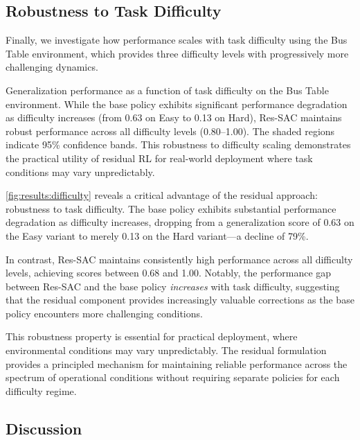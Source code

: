 \subsection{Robustness to Task Difficulty}
\label{sec:results:difficulty}

Finally, we investigate how performance scales with task difficulty using the Bus Table environment, which provides three difficulty levels with progressively more challenging dynamics.

{Generalization performance as a function of task difficulty on the Bus Table environment. While the base policy exhibits significant performance degradation as difficulty increases (from 0.63 on Easy to 0.13 on Hard), Res-SAC maintains robust performance across all difficulty levels (0.80--1.00). The shaded regions indicate 95\% confidence bands. This robustness to difficulty scaling demonstrates the practical utility of residual \ac{RL} for real-world deployment where task conditions may vary unpredictably.}

\autoref{fig:results:difficulty} reveals a critical advantage of the residual approach: robustness to task difficulty. The base policy exhibits substantial performance degradation as difficulty increases, dropping from a generalization score of 0.63 on the Easy variant to merely 0.13 on the Hard variant---a decline of 79\%.

In contrast, Res-SAC maintains consistently high performance across all difficulty levels, achieving scores between 0.68 and 1.00. Notably, the performance gap between Res-SAC and the base policy \emph{increases} with task difficulty, suggesting that the residual component provides increasingly valuable corrections as the base policy encounters more challenging conditions.

This robustness property is essential for practical deployment, where environmental conditions may vary unpredictably. The residual formulation provides a principled mechanism for maintaining reliable performance across the spectrum of operational conditions without requiring separate policies for each difficulty regime.

\subsection{Discussion}
\label{sec:results:discussion}


